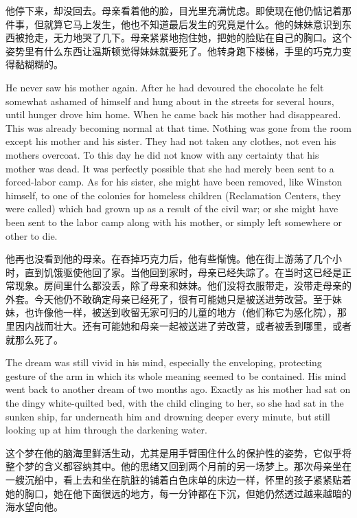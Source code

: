 \begin{paracol}{2}
\switchcolumn

他停下来，却没回去。母亲看着他的脸，目光里充满忧虑。即使现在他仍惦记着那件事，但就算它马上发生，他也不知道最后发生的究竟是什么。他的妹妹意识到东西被抢走，无力地哭了几下。母亲紧紧地抱住她，把她的脸贴在自己的胸口。这个姿势里有什么东西让温斯顿觉得妹妹就要死了。他转身跑下楼梯，手里的巧克力变得黏糊糊的。

\switchcolumn*

He never saw his mother again. After he had devoured the chocolate he
felt somewhat ashamed of himself and hung about in the streets for
several hours, until hunger drove him home. When he came back his mother
had disappeared. This was already becoming normal at that time. Nothing
was gone from the room except his mother and his sister. They had not
taken any clothes, not even his mother\textquotesingle s overcoat. To
this day he did not know with any certainty that his mother was dead. It
was perfectly possible that she had merely been sent to a forced-labor
camp. As for his sister, she might have been removed, like Winston
himself, to one of the colonies for homeless children (Reclamation
Centers, they were called) which had grown up as a result of the civil
war; or she might have been sent to the labor camp along with his
mother, or simply left somewhere or other to die.

\switchcolumn

他再也没看到他的母亲。在吞掉巧克力后，他有些惭愧。他在街上游荡了几个小时，直到饥饿驱使他回了家。当他回到家时，母亲已经失踪了。在当时这已经是正常现象。房间里什么都没丢，除了母亲和妹妹。他们没将衣服带走，没带走母亲的外套。今天他仍不敢确定母亲已经死了，很有可能她只是被送进劳改营。至于妹妹，也许像他一样，被送到收留无家可归的儿童的地方（他们称它为感化院），那里因内战而壮大。还有可能她和母亲一起被送进了劳改营，或者被丢到哪里，或者就那么死了。

\switchcolumn*

The dream was still vivid in his mind, especially the enveloping,
protecting gesture of the arm in which its whole meaning seemed to be
contained. His mind went back to another dream of two months ago.
Exactly as his mother had sat on the dingy white-quilted bed, with the
child clinging to her, so she had sat in the sunken ship, far underneath
him and drowning deeper every minute, but still looking up at him
through the darkening water.

\switchcolumn

这个梦在他的脑海里鲜活生动，尤其是用手臂围住什么的保护性的姿势，它似乎将整个梦的含义都容纳其中。他的思绪又回到两个月前的另一场梦上。那次母亲坐在一艘沉船中，看上去和坐在肮脏的铺着白色床单的床边一样，怀里的孩子紧紧贴着她的胸口，她在他下面很远的地方，每一分钟都在下沉，但她仍然透过越来越暗的海水望向他。


\end{paracol}
